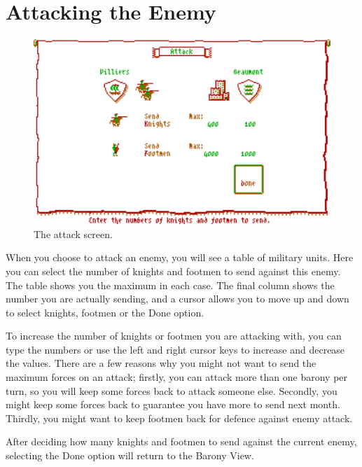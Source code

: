 \documentclass[8pt]{extarticle}
\begin{document}
%
%

\pagebreak %
\section*{Attacking the Enemy}

\begin{figure}
  \centering
  \includegraphics[width=\textwidth]{attack}
  \caption*{The attack screen.}
  \label{fig:title}
\end{figure}

\begin{multicols}{2}
\noindent
When you choose to attack an enemy, you will see a table of military units. Here you can select the number of knights and footmen to send against this enemy. The table shows you the maximum in each case. The final column shows the number you are actually sending, and a cursor allows you to move up and down to select knights, footmen or the Done option.

To increase the number of knights or footmen you are attacking with, you can type the numbers or use the left and right cursor keys to increase and decrease the values. There are a few reasons why you might not want to send the maximum forces on an attack; firstly, you can attack more than one barony per turn, so you will keep some forces back to attack someone else. Secondly, you might keep some forces back to guarantee you have more to send next month. Thirdly, you might want to keep footmen back for defence against enemy attack.

After deciding how many knights and footmen to send against the current enemy, selecting the Done option will return to the Barony View.
\end{multicols}
\end{document}
